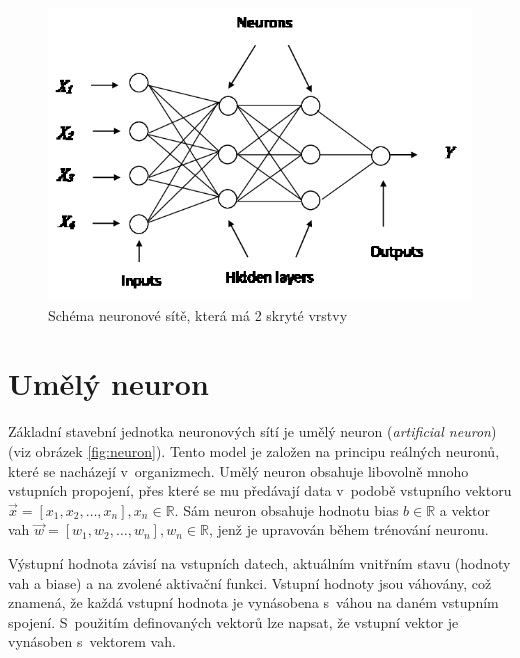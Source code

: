 \begin{figure}[H]
    \centering
    \includegraphics[scale=1.3]{obrazky-figures/mlp.png}
    \caption{\label{fig:mlp}Schéma neuronové sítě, která má 2 skryté vrstvy}
\end{figure}


\section{Umělý neuron}
Základní stavební jednotka neuronových sítí je umělý neuron (\textit{artificial neuron}) (viz obrázek \ref{fig:neuron}). Tento model je založen na principu reálných neuronů, které se nacházejí v~organizmech. Umělý neuron obsahuje libovolně mnoho vstupních propojení, přes které se mu předávají data v~podobě vstupního vektoru $\overrightarrow{x} = [x_1, x_2, \dots, x_n], x_n \in \mathbb{R}$. Sám neuron obsahuje hodnotu bias $b \in \mathbb{R}$ a vektor vah $\overrightarrow{w} = [w_1, w_2, \dots, w_n], w_n \in \mathbb{R}$, jenž je upravován během trénování neuronu.

Výstupní hodnota závisí na vstupních datech, aktuálním vnitřním stavu (hodnoty vah a biase) a na zvolené aktivační funkci. Vstupní hodnoty jsou váhovány, což znamená, že každá vstupní hodnota je vynásobena s~váhou na daném vstupním spojení. S~použitím definovaných vektorů lze napsat, že vstupní vektor je vynásoben s~vektorem vah.

